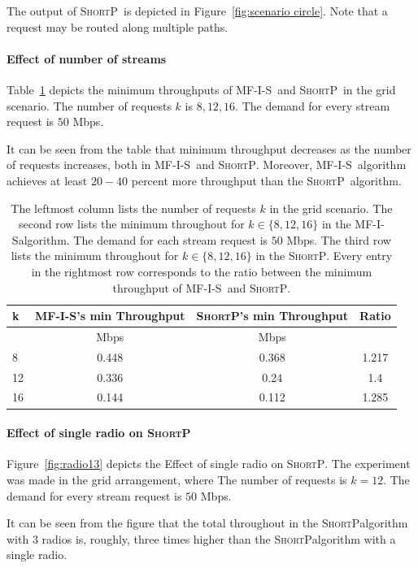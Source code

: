 \documentclass[12pt]{article}
\newenvironment{proof sketch}[1]{\noindent {\emph{Proof sketch of #1:}}}{\hfill \qed}
\newcommand{\algA}{\textsc{MF-I-S}}
\newcommand{\algB}{\textsc{ShortP}}
\newcommand{\algS}{\algB}
\begin{document}
The output of \algS\ is depicted in Figure~\ref{fig:scenario circle}.
Note that a request may be routed along multiple paths.


\paragraph{Effect of number of streams}
Table~\ref{tab:minthroughput} depicts the minimum throughputs of \algA\ and \algS\ in the grid scenario.
The number of requests $k$ is $8,12,16$. The demand for every stream request is $50$ Mbps.

It can be seen from the table that minimum throughput decreases as the number of requests increases, both in \algA\ and \algS.
Moreover, \algA\ algorithm achieves at least $20-40$ percent more throughput than the \algS\ algorithm.

\begin{table}
\centering\small
\begin{tabular}{|| l || c | c | c ||}

\hline
k & \algA 's min Throughput & \algS 's min Throughput & Ratio\\
\hline
& Mbps & Mbps & \\
\hline\hline
8 & 0.448 & 0.368  & 1.217  \\
12 & 0.336 & 0.24 & 1.4 \\
16 & 0.144  & 0.112 & 1.285 \\
\hline
\end{tabular}
\caption{The leftmost column lists the number of requests $k$ in the grid scenario. The second row lists the minimum throughout for $ k \in \{8,12,16\}$ in the \algA algorithm. The demand for each stream request is $50$ Mbps. The third row lists the minimum throughout for $ k \in \{8,12,16\}$ in the \algS. Every entry in the rightmost row corresponds to the ratio between the minimum throughput of \algA\ and \algS.}
\label{tab:minthroughput}
\end{table}

\paragraph{Effect of single radio on \algS}
Figure~\ref{fig:radio13} depicts the Effect of single radio on \algS. 
The experiment was made in the grid arrangement, where The number of requests is $k=12$.
The demand for every stream request is $50$ Mbps.

It can be seen from the figure that the total throughout in the \algS algorithm with $3$ radios is, roughly, three times higher than the \algS algorithm with a single radio.
\end{document}
